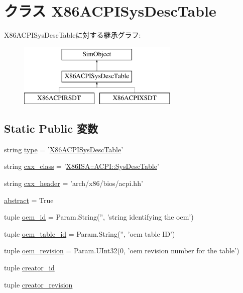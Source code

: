 \hypertarget{classACPI_1_1X86ACPISysDescTable}{
\section{クラス X86ACPISysDescTable}
\label{classACPI_1_1X86ACPISysDescTable}
}
X86ACPISysDescTableに対する継承グラフ:\begin{figure}[H]
\begin{center}
\leavevmode
\includegraphics[height=3cm]{classACPI_1_1X86ACPISysDescTable}
\end{center}
\end{figure}
\subsection*{Static Public 変数}
\begin{DoxyCompactItemize}
\item 
string \hyperlink{classACPI_1_1X86ACPISysDescTable_acce15679d830831b0bbe8ebc2a60b2ca}{type} = '\hyperlink{classACPI_1_1X86ACPISysDescTable}{X86ACPISysDescTable}'
\item 
string \hyperlink{classACPI_1_1X86ACPISysDescTable_a58cd55cd4023648e138237cfc0822ae3}{cxx\_\-class} = '\hyperlink{classX86ISA_1_1ACPI_1_1SysDescTable}{X86ISA::ACPI::SysDescTable}'
\item 
string \hyperlink{classACPI_1_1X86ACPISysDescTable_a17da7064bc5c518791f0c891eff05fda}{cxx\_\-header} = 'arch/x86/bios/acpi.hh'
\item 
\hyperlink{classACPI_1_1X86ACPISysDescTable_a17fa61ac3806b481cafee5593b55e5d0}{abstract} = True
\item 
tuple \hyperlink{classACPI_1_1X86ACPISysDescTable_a92058ac009c691aede73e4bf13dbbb94}{oem\_\-id} = Param.String('', 'string identifying the oem')
\item 
tuple \hyperlink{classACPI_1_1X86ACPISysDescTable_a1b14b06ab0bc704cb78c2241879d5c21}{oem\_\-table\_\-id} = Param.String('', 'oem table ID')
\item 
tuple \hyperlink{classACPI_1_1X86ACPISysDescTable_a2ceceaea19237ad1dc779d036fb5891d}{oem\_\-revision} = Param.UInt32(0, 'oem revision number for the table')
\item 
tuple \hyperlink{classACPI_1_1X86ACPISysDescTable_aae955f21f86557f4b16fc4a48b628955}{creator\_\-id}
\item 
tuple \hyperlink{classACPI_1_1X86ACPISysDescTable_a8822b97118208412b53ad97e69336f3b}{creator\_\-revision}
\end{DoxyCompactItemize}



